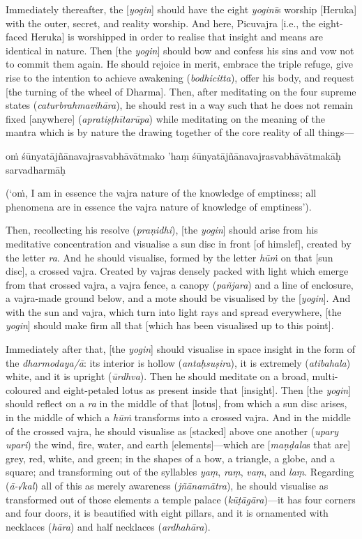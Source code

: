 \documentclass[naipra.tex]{subfiles}
\begin{document}
Immediately thereafter, the [\emph{yogin}] should have the eight \emph{yoginī}s worship [Heruka] with the outer, secret, and reality worship. 
And here, Picuvajra [i.e., the eight-faced Heruka] is worshipped in order to realise that insight and means are identical in nature.
Then [the \emph{yogin}] should bow and confess his sins and vow not to commit them again.
He should rejoice in merit, embrace the triple refuge, give rise to the intention to achieve awakening (\emph{bodhicitta}), offer his body, and request [the turning of the wheel of Dharma].
Then, after meditating on the four supreme states (\emph{caturbrahmavihāra}), he should rest in a way such that he does not remain fixed [anywhere] (\emph{apratiṣṭhītarūpa}) while meditating on the meaning of the mantra which is by nature the drawing together of the core reality of all things—\begin{mantra}oṁ śūnyatājñānavajrasvabhāvātmako 'haṃ śūnyatājñānavajrasvabhāvātmakāḥ sarvadharmāḥ\end{mantra} (`oṁ, I am in essence the vajra nature of the knowledge of emptiness; all phenomena are in essence the vajra nature of knowledge of emptiness').

Then, recollecting his resolve (\emph{praṇidhi}), [the \emph{yogin}] should arise from his meditative concentration and visualise a sun disc in front [of himslef], created by the letter \emph{ra}.
And he should visualise, formed by the letter \emph{hūṁ} on that [sun disc], a crossed vajra.
Created by vajras densely packed with light which emerge from that crossed vajra, a vajra fence, a canopy (\emph{pañjara}) and a line of enclosure, a vajra-made ground below, and a mote should be visualised by the [\emph{yogin}].
And with the sun and vajra, which turn into light rays and spread everywhere, [the \emph{yogin}] should make firm all that [which has been visualised up to this point].

Immediately after that, [the \emph{yogin}] should visualise in space insight in the form of the \emph{dharmodaya/ā}: its interior is hollow (\emph{antaḥsuṣira}), it is extremely (\emph{atibahala}) white, and it is upright (\emph{ūrdhva}).
Then he should meditate on a broad, multi-coloured and eight-petaled lotus as present inside that [insight].
Then [the \emph{yogin}] should reflect on a \emph{ra} in the middle of that [lotus], from which a sun disc arises, in the middle of which a \emph{hūṁ} transforms into a crossed vajra. 
And in the middle of the crossed vajra, he should visualise as [stacked] above one another (\emph{upary upari}) the wind, fire, water, and earth [elements]—which are [\emph{maṇḍala}s that are] grey, red, white, and green; in the shapes of a bow, a triangle, a globe, and a square; and transforming out of the syllables \emph{yaṃ}, \emph{raṃ}, \emph{vaṃ}, and \emph{laṃ}.
Regarding (\emph{ā-√kal}) all of this as merely awareness (\emph{jñānamātra}), he should visualise as transformed out of those elements a temple palace (\emph{kūṭāgāra})—it has four corners and four doors, it is beautified with eight pillars, and it is ornamented with necklaces (\emph{hāra}) and half necklaces (\emph{ardhahāra}).
\end{document}
